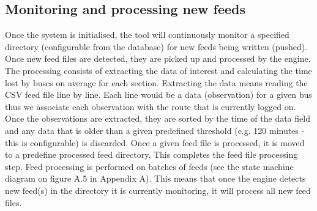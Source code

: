 \subsection{Monitoring and processing new feeds}
Once the system is initialised, the tool will continuously monitor a specified directory (configurable from the database) for new feeds being written (pushed). Once new feed files are detected, they are picked up and processed by the engine. The processing consists of extracting the data of interest and calculating the time lost by buses on average for each section. Extracting the data means reading the CSV feed file line by line. Each line would be a data (observation) for a given bus thus we associate each observation with the route that is currently logged on. Once the observations are extracted, they are sorted by the time of the data field and any data that is older than a given predefined threshold (e.g. 120 minutes - this is configurable) is discarded. Once a given feed file is processed, it is moved to a predefine processed feed directory. This completes the feed file processing step. Feed processing is performed on batches of feeds (see the state machine diagram on figure A.5 in Appendix A). This means that once the engine detects new feed(s) in the directory it is currently monitoring, it will process all new feed files. 

